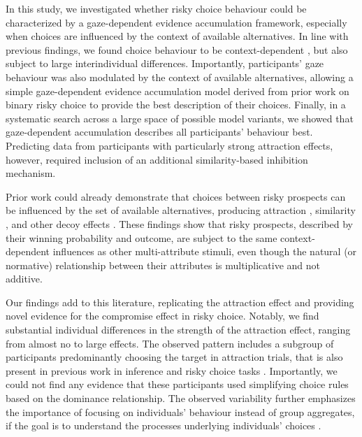 \documentclass[11pt, a4paper]{article}
\begin{document}
In this study, we investigated whether risky choice behaviour could be characterized by a gaze-dependent evidence accumulation framework, especially when choices are influenced by the context of available alternatives. In line with previous findings, we found choice behaviour to be context-dependent \autocite{busemeyer2019CognitiveNeuralBases}, but also subject to large interindividual differences. Importantly, participants’ gaze behaviour was also modulated by the context of available alternatives, allowing a simple gaze-dependent evidence accumulation model derived from prior work on binary risky choice \autocite{glickman2019FormationPreferenceRisky} to provide the best description of their choices. Finally, in a systematic search across a large space of possible model variants, we showed that gaze-dependent accumulation describes all participants’ behaviour best. Predicting data from participants with particularly strong attraction effects, however, required inclusion of an additional similarity-based inhibition mechanism.

Prior work could already demonstrate that choices between risky prospects can be influenced by the set of available alternatives, producing attraction \autocite{huber1982AddingAsymmetricallyDominated,mohr2017AttractionEffectRisky,soltani2012RangeNormalizationModelContextDependent,wedell1991DistinguishingModelsContextually}, similarity \autocite{tversky1972EliminationAspectsTheory}, and other decoy effects \autocite{soltani2012RangeNormalizationModelContextDependent}. These findings show that risky prospects, described by their winning probability and outcome, are subject to the same context-dependent influences as other multi-attribute stimuli, even though the natural (or normative) relationship between their attributes is multiplicative and not additive.

Our findings add to this literature, replicating the attraction effect and providing novel evidence for the compromise effect in risky choice. Notably, we find substantial individual differences in the strength of the attraction effect, ranging from almost no to large effects. The observed pattern includes a subgroup of participants predominantly choosing the target in attraction trials, that is also present in previous work in inference \autocite{trueblood2012MultialternativeContextEffects} and risky choice tasks \autocite{mohr2017AttractionEffectRisky}. Importantly, we could not find any evidence that these participants used simplifying choice rules based on the dominance relationship. The observed variability further emphasizes the importance of focusing on individuals’ behaviour instead of group aggregates, if the goal is to understand the processes underlying individuals’ choices \autocite{liew2016AppropriacyAveragingStudy}.
\end{document}
